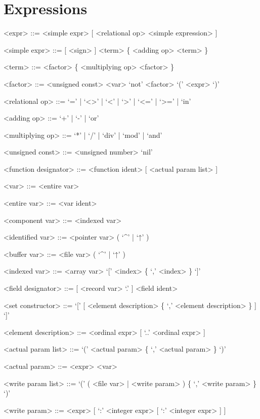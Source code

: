 \documentclass{article}
\begin{document}
\section{Expressions}

{
  \begin{grammar}
    <expr> ::= <simple expr> [ <relational op> <simple expression> ]

    <simple expr> ::= [ <sign> ] <term> \{ <adding op> <term> \}

    <term> ::= <factor> \{ <multiplying op> <factor> \}

    <factor> ::= <unsigned const>  \alt <var>   \alt `not' <factor> \alt `(' <expr> `)'

    <relational op> ::= `=' | `<>' | `<' | `>' | `<=' | `>=' | `in'

    <adding op> ::= `+' | `-' | `or'

    <multiplying op> ::= `*' | `/' | `div' | `mod' | `and'

    <unsigned const> ::= <unsigned number>   \alt `nil'

    <function designator> ::= <function ident> [ <actual param list> ]

    <var> ::= <entire var>   

    <entire var> ::= <var ident>

    <component var> ::= <indexed var> 

    <identified var> ::= <pointer var> ( `^' | `↑' )

    <buffer var> ::= <file var> ( `^' | `↑' )

    <indexed var> ::= <array var> `[' <index> \{ `,' <index> \} `]'

    <field designator> ::= [ <record var> `.' ] <field ident>

    <set constructor> ::= `[' [ <element description> \{ `,' <element description> \} ] `]'

    <element description> ::= <ordinal expr> [ `..' <ordinal expr> ]

    <actual param list> ::= `(' <actual param> \{ `,' <actual param> \} `)'

    <actual param> ::= <expr> \alt <var>  

    <write param list> ::= `(' ( <file var> | <write param> ) \{  `,' <write param> \} `)'

    <write param> ::= <expr> [ `:' <integer expr> [ `:' <integer expr> ] ]
  \end{grammar}
}
\end{document}
